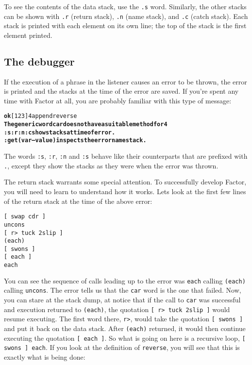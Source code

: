 \documentclass{report}
\begin{document}
To see the contents of the data stack, use the \texttt{.s} word. Similarly, the other stacks can be shown with \texttt{.r} (return stack), \texttt{.n} (name stack), and \texttt{.c} (catch stack). Each stack is printed with each element on its own line; the top of the stack is the first element printed.

\subsection{The debugger}

If the execution of a phrase in the listener causes an error to be thrown, the error
is printed and the stacks at the time of the error are saved. If you're spent any
time with Factor at all, you are probably familiar with this type of message:

\begin{alltt}
\textbf{ok} [ 1 2 3 ] 4 append reverse
\textbf{The generic word car does not have a suitable method for 4
:s :r :n :c show stacks at time of error.
:get ( var -- value ) inspects the error namestack.}
\end{alltt}

The words \texttt{:s}, \texttt{:r}, \texttt{:n} and \texttt{:s} behave like their counterparts that are prefixed with \texttt{.}, except they show the stacks as they were when the error was thrown.

The return stack warrants some special attention. To successfully develop Factor, you will need to learn to understand how it works. Lets look at the first few lines of the return stack at the time of the above error:

\begin{verbatim}
[ swap cdr ]
uncons
[ r> tuck 2slip ]
(each)
[ swons ]
[ each ]
each
\end{verbatim}

You can see the sequence of calls leading up to the error was \texttt{each} calling \texttt{(each)} calling \texttt{uncons}. The error tells us that the \texttt{car} word is the one that failed. Now, you can stare at the stack dump, at notice that if the call to \texttt{car} was successful and execution returned to \texttt{(each)}, the quotation \texttt{[ r> tuck 2slip ]} would resume executing. The first word there, \texttt{r>}, would take the quotation \texttt{[ swons ]} and put it back on the data stack. After \texttt{(each)} returned, it would then continue executing the quotation \texttt{[ each ]}. So what is going on here is a recursive loop, \texttt{[ swons ] each}. If you look at the definition of \texttt{reverse}, you will see that this is exactly what is being done:
\end{document}
